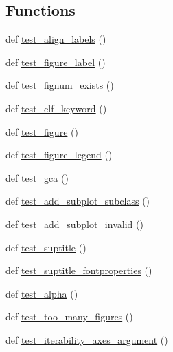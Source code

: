 \subsection*{Functions}
\begin{DoxyCompactItemize}
\item 
def \hyperlink{namespacematplotlib_1_1tests_1_1test__figure_aa079bad81c959049700454963102343b}{test\+\_\+align\+\_\+labels} ()
\item 
def \hyperlink{namespacematplotlib_1_1tests_1_1test__figure_ada33094a1e9f833a68ff353bdc6fde08}{test\+\_\+figure\+\_\+label} ()
\item 
def \hyperlink{namespacematplotlib_1_1tests_1_1test__figure_a6a01cc521d9e49d427871e55abdd45ee}{test\+\_\+fignum\+\_\+exists} ()
\item 
def \hyperlink{namespacematplotlib_1_1tests_1_1test__figure_a76d08ae58f0f6601cbfee2f4fc7090a3}{test\+\_\+clf\+\_\+keyword} ()
\item 
def \hyperlink{namespacematplotlib_1_1tests_1_1test__figure_af60274cbfafed12857dfa6f30893af97}{test\+\_\+figure} ()
\item 
def \hyperlink{namespacematplotlib_1_1tests_1_1test__figure_a310c359c0203e631283ac04a7a6ecaa5}{test\+\_\+figure\+\_\+legend} ()
\item 
def \hyperlink{namespacematplotlib_1_1tests_1_1test__figure_ac99ebb621120426ed8154150f6d87ca0}{test\+\_\+gca} ()
\item 
def \hyperlink{namespacematplotlib_1_1tests_1_1test__figure_a51089ce1274c949462391a265d3d0663}{test\+\_\+add\+\_\+subplot\+\_\+subclass} ()
\item 
def \hyperlink{namespacematplotlib_1_1tests_1_1test__figure_a55cb8b57d3a2353725cd426d887b909b}{test\+\_\+add\+\_\+subplot\+\_\+invalid} ()
\item 
def \hyperlink{namespacematplotlib_1_1tests_1_1test__figure_a8dfa6ad0840266d831e1f0240c450b98}{test\+\_\+suptitle} ()
\item 
def \hyperlink{namespacematplotlib_1_1tests_1_1test__figure_a06e2115fb38d9acd06fcbab7af9d1378}{test\+\_\+suptitle\+\_\+fontproperties} ()
\item 
def \hyperlink{namespacematplotlib_1_1tests_1_1test__figure_aa86dee65d45788fccc0a2ae676a6cf14}{test\+\_\+alpha} ()
\item 
def \hyperlink{namespacematplotlib_1_1tests_1_1test__figure_ad3d824eb8f4e6fedcbf017f2e9245777}{test\+\_\+too\+\_\+many\+\_\+figures} ()
\item 
def \hyperlink{namespacematplotlib_1_1tests_1_1test__figure_ab5778cd20292a8cf6df529604c25d2e2}{test\+\_\+iterability\+\_\+axes\+\_\+argument} ()

\end{DoxyCompactItemize}

